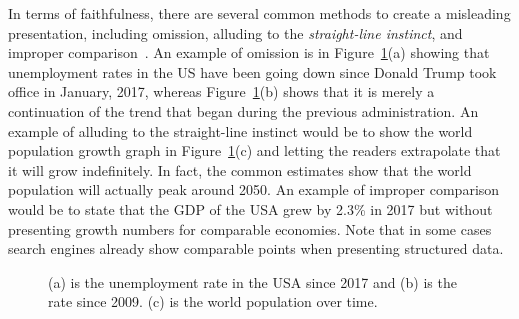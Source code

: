 \documentclass[11pt]{article}
\begin{document}
In terms of faithfulness, there are several common methods to create a misleading presentation, including 
 omission, alluding to the {\em straight-line instinct}, and improper comparison~\cite{factfulness}. An example of omission is in Figure~\ref{fig:fig}(a) showing that unemployment rates in the US have been going down since Donald Trump took office in January, 2017, whereas Figure~\ref{fig:fig}(b)  shows that it is merely a continuation of the trend that began during the previous administration. An example of alluding to the straight-line instinct would be to show the world population growth graph in Figure~\ref{fig:fig}(c) and letting the readers extrapolate that it will grow indefinitely. In fact, the common estimates show that the world population will actually peak around 2050. An example of improper comparison would be to state that the GDP of the USA grew by 2.3\% in 2017 but without presenting growth numbers for comparable economies. Note that in some cases search engines already show comparable points when presenting structured data. 

\begin{figure}

\caption{(a) is the unemployment rate in the USA since 2017 and (b) is the rate since 2009. (c) is the world population over time.}
\label{fig:fig}
\end{figure}
\end{document}
